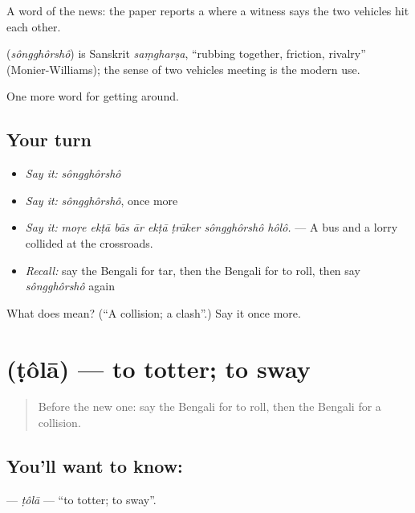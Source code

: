 A word of the news: the paper reports a  where a witness says the two vehicles hit each other.

\begin{cousinweb}
\textbf{} (\emph{sôngghôrshô}) is Sanskrit \emph{saṃgharṣa}, \textquotedblleft{}rubbing together, friction, rivalry\textquotedblright{} (Monier-Williams); the sense of two vehicles meeting is the modern use.
\end{cousinweb}

\begin{grammarlens}[title={What you've built}]
One more word for getting around.
\end{grammarlens}

\subsection*{Your turn}
\begin{itemize}
\raggedright
  \item \emph{Say it:} \emph{sôngghôrshô}
  \item \emph{Say it:} \emph{sôngghôrshô}, once more
  \item \emph{Say it:} \emph{moṛe ekṭā bās ār ekṭā ṭrāker sôngghôrshô hôlô.} — A bus and a lorry collided at the crossroads.
  \item \emph{Recall:} say the Bengali for tar, then the Bengali for to roll, then say \emph{sôngghôrshô} again
\end{itemize}

\begin{tcolorbox}[breakable,colback=teal!4,colframe=teal!35!black,title={Before you move on}]
What does  mean? (\textquotedblleft{}A collision; a clash\textquotedblright{}.) Say it once more.
\end{tcolorbox}
\section[\texorpdfstring{\bn{টলা} (ṭôlā)}{টলা (ṭôlā)}]{ (ṭôlā) — to totter; to sway}

\label{lesson:BN-C391-tola}



\begin{quote}
Before the new one: say the Bengali for to roll, then the Bengali for a collision.
\end{quote}

\subsection*{You'll want to know: }
\textbf{} — \emph{ṭôlā} — \textquotedblleft{}to totter; to sway\textquotedblright{}.

